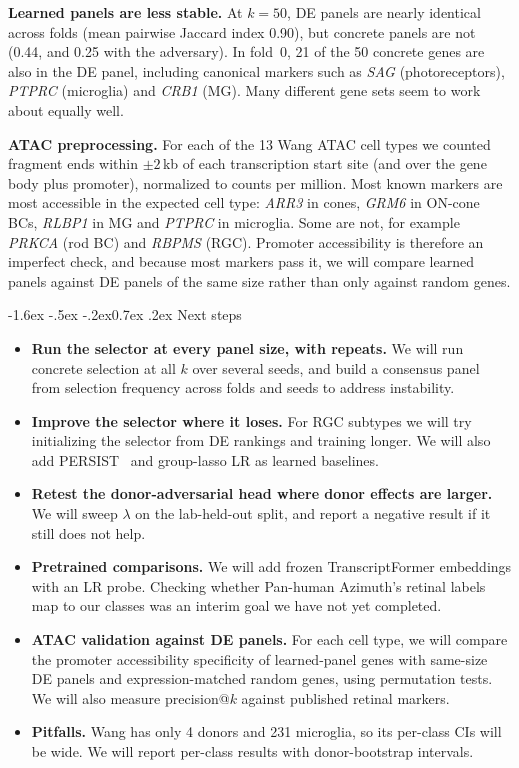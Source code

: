 \documentclass[11pt]{article}
\makeatletter
\renewcommand\section{\@startsection{section}{1}{\z@}%
    {-1.6ex \@plus -.5ex \@minus -.2ex}{0.7ex \@plus .2ex}%
    {\normalfont\large\bfseries}}
\makeatother
\begin{document}
\textbf{Learned panels are less stable.} At $k=50$, DE panels are nearly identical across
folds (mean pairwise Jaccard index 0.90), but concrete panels are not (0.44, and 0.25 with
the adversary). In fold~0, 21 of the 50 concrete genes are also in the DE panel, including
canonical markers such as \emph{SAG} (photoreceptors), \emph{PTPRC} (microglia) and
\emph{CRB1} (MG). Many different gene sets seem to work about equally well.

\textbf{ATAC preprocessing.} For each of the 13 Wang ATAC cell types we counted fragment
ends within $\pm2$\,kb of each transcription start site (and over the gene body plus
promoter), normalized to counts per million. Most known markers are most accessible in the
expected cell type: \emph{ARR3} in cones, \emph{GRM6} in ON-cone BCs,
\emph{RLBP1} in MG and \emph{PTPRC} in microglia. Some are not, for example \emph{PRKCA} (rod BC) and \emph{RBPMS}
(RGC). Promoter accessibility is therefore an imperfect check, and because most markers pass
it, we will compare learned panels against DE panels of the same size rather than only
against random genes.

\section{Next steps}

\begin{itemize}
\item \textbf{Run the selector at every panel size, with repeats.} We will run concrete
selection at all $k$ over several seeds, and build a consensus panel from selection
frequency across folds and seeds to address instability.
\item \textbf{Improve the selector where it loses.} For RGC subtypes we will try
initializing the selector from DE rankings and training longer. We will also add
PERSIST~\cite{covert2023} and group-lasso LR as learned baselines.
\item \textbf{Retest the donor-adversarial head where donor effects are larger.} We will
sweep $\lambda$ on the lab-held-out split, and report a negative result if it still does
not help.
\item \textbf{Pretrained comparisons.} We will add frozen TranscriptFormer embeddings with
an LR probe. Checking whether Pan-human Azimuth's retinal labels map to our classes was an
interim goal we have not yet completed.
\item \textbf{ATAC validation against DE panels.} For each cell type, we will compare the
promoter accessibility specificity of learned-panel genes with same-size DE panels and
expression-matched random genes, using permutation tests. We will also measure
precision@$k$ against published retinal markers.
\item \textbf{Pitfalls.} Wang has only 4 donors and 231 microglia, so its per-class CIs will
be wide. We will report per-class results with donor-bootstrap intervals.
\end{itemize}

\printbibliography
\end{document}

